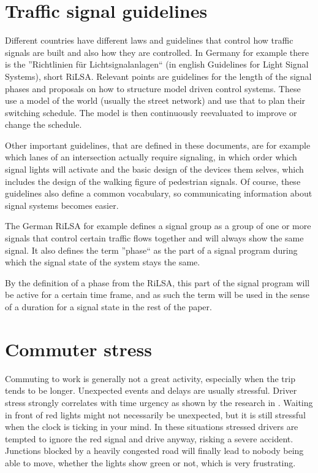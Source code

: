 \section{Traffic signal guidelines}

Different countries have different laws and guidelines that control how traffic signals are built and also how they are controlled.
In Germany for example there is the ''Richtlinien für Lichtsignalanlagen`` (in english Guidelines for Light Signal Systems), short RiLSA. Relevant points are guidelines for the length of the signal phases and proposals on how to structure model driven control systems. These use a model of the world (usually the street network) and use that to plan their switching schedule. The model is then continuously reevaluated to improve or change the schedule.

Other important guidelines, that are defined in these documents, are for example which lanes of an intersection actually require signaling, in which order which signal lights will activate and the basic design of the devices them selves, which includes the design of the walking figure of pedestrian signals. Of course, these guidelines also define a common vocabulary, so communicating information about signal systems becomes easier.

The German RiLSA for example defines a signal group as a group of one or more signals that control certain traffic flows together and will always show the same signal. It also defines the term ''phase`` as the part of a signal program during which the signal state of the system stays the same. \cite{rilsa}

By the definition of a phase from the RiLSA, this part of the signal program will be active for a certain time frame, and as such the term will be used in the sense of a duration for a signal state in the rest of the paper.

\section{Commuter stress}
\label{commuter_stress}

Commuting to work is generally not a great activity, especially when the trip tends to be longer. Unexpected events and delays are usually stressful. Driver stress strongly correlates with time urgency as shown by the research in \cite{aggressive_behaviour}. Waiting in front of red lights might not necessarily be unexpected, but it is still stressful when the clock is ticking in your mind. In these situations stressed drivers are tempted to ignore the red signal and drive anyway, risking a severe accident. Junctions blocked by a heavily congested road will finally lead to nobody being able to move, whether the lights show green or not, which is very frustrating.

